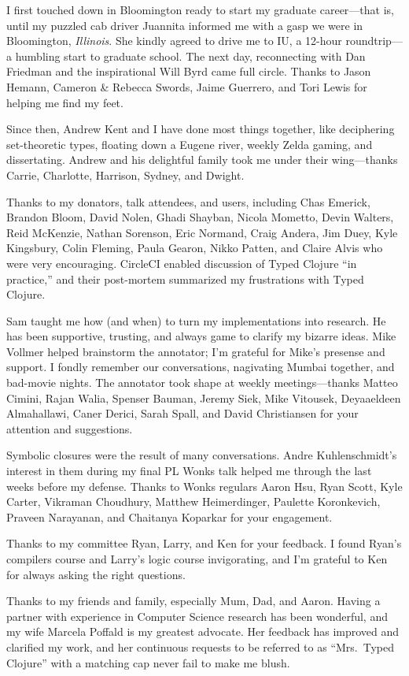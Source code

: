 I first touched down in Bloomington ready to start my graduate career---that is, until 
my puzzled cab driver Juannita informed me with a gasp
we were in Bloomington, \emph{Illinois}.
She kindly agreed to drive me to IU, a 12-hour roundtrip---a humbling start to graduate school.
The next day, reconnecting with Dan Friedman and the inspirational Will Byrd came full circle.
Thanks to Jason Hemann, Cameron \& Rebecca Swords, Jaime Guerrero, 
and Tori Lewis for helping me find my feet.

Since then, Andrew Kent and I have done most things together, like deciphering 
set-theoretic types, floating down a Eugene river,
weekly Zelda gaming, and dissertating.
Andrew and his delightful family took me under their wing---thanks
Carrie, Charlotte, Harrison, Sydney, and Dwight.

Thanks to my donators, talk attendees, and users, including
Chas Emerick, Brandon Bloom, David Nolen,
Ghadi Shayban, Nicola Mometto, Devin Walters, Reid McKenzie, Nathan Sorenson, Eric
Normand, Craig Andera, Jim Duey, Kyle Kingsbury, Colin Fleming, Paula Gearon,
Nikko Patten, and Claire Alvis who were very encouraging.
CircleCI enabled discussion of Typed Clojure ``in practice,'' and their post-mortem
summarized my frustrations with Typed Clojure.

Sam taught me how (and when) to turn my implementations into research.
He has been supportive, trusting, and always game to clarify my bizarre ideas.
Mike Vollmer helped brainstorm the annotator;
I'm grateful for Mike's presense and support. I fondly remember our
conversations, nagivating Mumbai together, and bad-movie nights.
The annotator took shape at weekly meetings---thanks
Matteo Cimini, Rajan Walia, Spenser Bauman, Jeremy Siek, Mike Vitousek, Deyaaeldeen Almahallawi,
Caner Derici, Sarah Spall, and David Christiansen for your attention and suggestions.

Symbolic closures were the result of many conversations.
Andre Kuhlenschmidt's interest in them during my final PL Wonks talk
helped me through the last weeks before my defense.
Thanks to Wonks regulars Aaron Hsu, 
Ryan Scott, Kyle Carter, 
Vikraman Choudhury, Matthew Heimerdinger, Paulette Koronkevich, Praveen Narayanan,
and Chaitanya Koparkar for your engagement.

Thanks to my committee Ryan, Larry, and Ken for your feedback.
I found Ryan's compilers course and Larry's logic course invigorating,
and I'm grateful to Ken for always asking the right questions.

Thanks to my friends and family, especially Mum, Dad, and Aaron.
Having a partner with experience in Computer Science research has been wonderful, 
and my wife Marcela Poffald is my greatest advocate.
Her feedback has improved and clarified my work,
and her continuous requests
to be referred to as ``Mrs.~Typed Clojure'' with a matching cap never
fail to make me blush.
